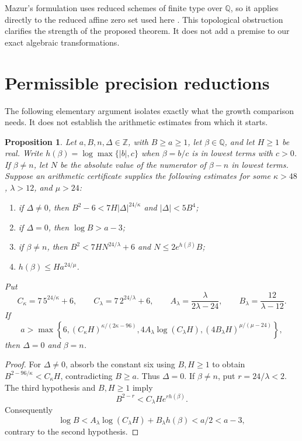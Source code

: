 \documentclass[11pt]{article}
\newtheorem{proposition}[theorem]{Proposition}
\theoremstyle{definition}
\newcommand{\Q}{\mathbb Q}
\begin{document}
Mazur's formulation uses reduced schemes of finite type over $\Q$,
so it applies directly to the reduced affine zero set used here
\cite[Section 1 and Conjecture 3]{Mazur1995}. This topological obstruction
clarifies the strength of the proposed theorem. It does not add a
premise to our exact algebraic transformations.


\appendix
\section{Permissible precision reductions}

The following elementary argument isolates exactly what the growth
comparison needs. It does not establish the arithmetic estimates from
which it starts.

\begin{proposition}\label{prop:precision-thresholds}
Let $a,B,n,\Delta\in\mathbb Z$, with $B\ge a\ge1$, let
$\beta\in\mathbb Q$, and let $H\ge1$ be real.
Write $h(\beta)=\log\max\{|b|,c\}$ when $\beta=b/c$ is in lowest
terms with $c>0$. If $\beta\ne n$, let $N$ be the absolute value
of the numerator of $\beta-n$ in lowest terms.
Suppose an arithmetic certificate supplies the following estimates
for some $\kappa>48$,
$\lambda>12$, and $\mu>24$:
\begin{enumerate}
\item if $\Delta\ne0$, then
$B^2-6<7H|\Delta|^{24/\kappa}$ and $|\Delta|<5B^4$;
\item if $\Delta=0$, then $\log B>a-3$;
\item if $\beta\ne n$, then
$B^2<7HN^{24/\lambda}+6$ and $N\le2e^{h(\beta)}B$;
\item $h(\beta)\le H a^{24/\mu}$.
\end{enumerate}
Put
\[
 C_\kappa=7\,5^{24/\kappa}+6,\qquad
 C_\lambda=7\,2^{24/\lambda}+6,\qquad
 A_\lambda=\frac{\lambda}{2\lambda-24},\qquad
 B_\lambda=\frac{12}{\lambda-12}.
\]
If
\[
 a>\max\left\{6,
 (C_\kappa H)^{\kappa/(2\kappa-96)},
 4A_\lambda\log(C_\lambda H),
 (4B_\lambda H)^{\mu/(\mu-24)}\right\},
\]
then $\Delta=0$ and $\beta=n$.
\end{proposition}
\begin{proof}
For $\Delta\ne0$, absorb the constant six using $B,H\ge1$ to obtain
$B^{2-96/\kappa}<C_\kappa H$, contradicting $B\ge a$.
Thus $\Delta=0$. If $\beta\ne n$, put $r=24/\lambda<2$.
The third hypothesis and $B,H\ge1$ imply
\[
 B^{2-r}<C_\lambda H e^{r h(\beta)}.
\]
Consequently
\[
 \log B<A_\lambda\log(C_\lambda H)+B_\lambda h(\beta)<a/2<a-3,
\]
contrary to the second hypothesis.
\end{proof}
\end{document}
